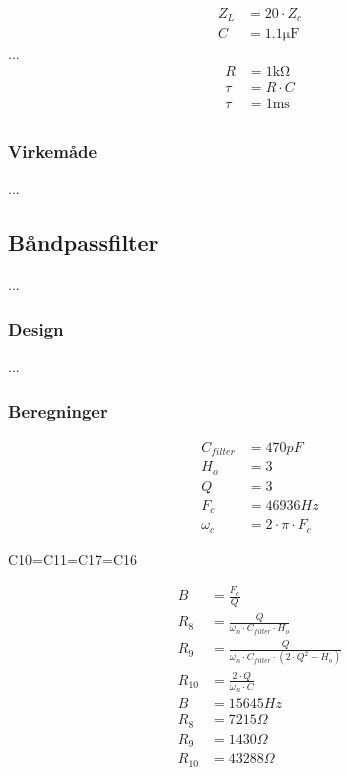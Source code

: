 \begin{align}
	Z_L & = 20 \cdot Z_c \\
	C & = 1.1 \si{\micro\farad}
	\end{align}
...
\begin{align}
	R & = 1 \si{\kilo\ohm} \nonumber \\
	\tau & = R \cdot C \\
	\tau & = 1 \si{\milli\second} \\
	\end{align}
\subsubsection{Virkemåde}

...

\subsection{Båndpassfilter}
...

\subsubsection{Design}
...

\subsubsection{Beregninger}

\begin{align}
C_{filter} & = 470pF\\
H_o & = 3\\
Q & = 3\\
F_c & = 46936Hz \\
\omega_c & = 2 \cdot \pi \cdot F_c
\end{align}

C10=C11=C17=C16

\begin{align}
B & = \frac{F_c}{Q} \\
R_8 & = \frac{Q}{\omega_n \cdot C_{filter} \cdot H_o } \\
R_9 & = \frac{Q}{ \omega_n \cdot C_{filter} \cdot \left( 2 \cdot Q^2 - H_o \right) } \\
R_{10} & = \frac{2 \cdot Q}{ \omega_n \cdot C} \\
B & = 15645Hz \\
R_8 & = 7215 \Omega \\
R_9 & = 1430 \Omega \\
R_{10} & = 43288 \Omega
\end{align}

